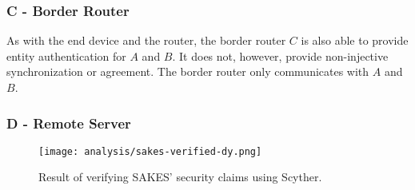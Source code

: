 \subsubsection{C - Border Router}

As with the end device and the router, the border router $C$ is also able to provide entity authentication for $A$ and $B$. It does not, however, provide non-injective synchronization or agreement. The border router only communicates with $A$ and $B$.



\subsubsection{D - Remote Server}




\begin{figure}[h]
	\centering
	\texttt{[image: analysis/sakes-verified-dy.png]}
	\caption{Result of verifying SAKES' security claims using Scyther.}
	\label{fig:sakes-verified}
\end{figure}













